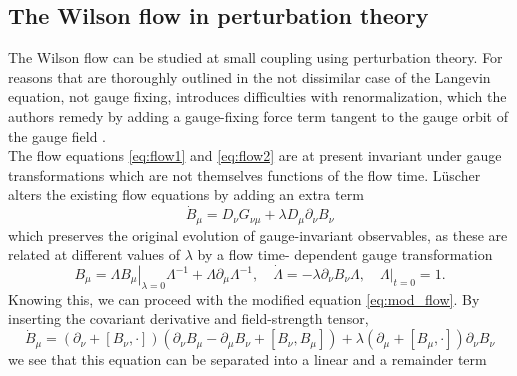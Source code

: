 \documentclass[a4paper,10pt]{book}
\begin{document}
\subsection{The Wilson flow in perturbation theory}
The Wilson flow can be studied at small coupling using perturbation theory. For reasons that are thoroughly outlined in the not dissimilar case of the Langevin equation, not gauge fixing, introduces difficulties with renormalization, which the authors remedy by adding a gauge-fixing force term tangent to the gauge orbit of the gauge field \cite{Zinn-JustinJ1988Wift}.\\The flow equations \eqref{eq:flow1} and \eqref{eq:flow2} are at present invariant under gauge transformations which are not themselves functions of the flow time. Lüscher alters the existing flow equations by adding an extra term
\begin{equation}\label{eq:mod_flow}
\dot{B}_{\mu}=D_{\nu} G_{\nu \mu}+\lambda D_{\mu} \partial_{\nu} B_{\nu}
\end{equation}
which preserves the original evolution of gauge-invariant observables, as these are related at different values of $\lambda$ by a flow time- dependent gauge transformation
\begin{equation}
B_{\mu}=\left.\Lambda B_{\mu}\right|_{\lambda=0} \Lambda^{-1}+\Lambda \partial_{\mu} \Lambda^{-1}, \quad \dot{\Lambda}=-\lambda \partial_{\nu} B_{\nu} \Lambda,\left.\quad \Lambda\right|_{t=0}=1.
\end{equation}
Knowing this, we can proceed with the modified equation \eqref{eq:mod_flow}. By inserting the covariant derivative and field-strength tensor, 
\begin{equation}
\dot{B}_{\mu}=\left(\partial_{\nu}+\left[B_{\nu}, \cdot\right]\right)\left(\partial_{\nu} B_{\mu}-\partial_{\mu} B_{\nu}+\left[B_{\nu}, B_{\mu}\right]\right)+\lambda \left(\partial_{\mu}+\left[B_{\mu}, \cdot\right]\right) \partial_{\nu} B_{\nu}
\end{equation}
we see that this equation can be separated into a linear and a remainder term
\end{document}
